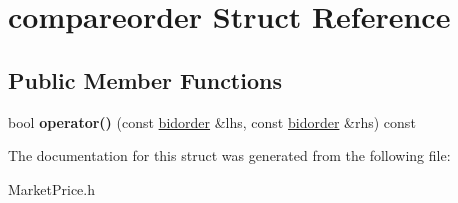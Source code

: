 \hypertarget{structcompareorder}{}\section{compareorder Struct Reference}
\label{structcompareorder}
\subsection*{Public Member Functions}
\begin{DoxyCompactItemize}
\item 
bool {\bfseries operator()} (const \hyperlink{structbidorder}{bidorder} \&lhs, const \hyperlink{structbidorder}{bidorder} \&rhs) const \hypertarget{structcompareorder_a9d6b5a70f86ed42336b29d1f400a2b52}{}\label{structcompareorder_a9d6b5a70f86ed42336b29d1f400a2b52}

\end{DoxyCompactItemize}


The documentation for this struct was generated from the following file\+:\begin{DoxyCompactItemize}
\item 
Market\+Price.\+h\end{DoxyCompactItemize}
